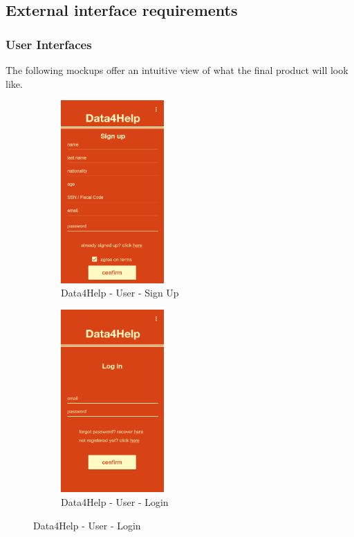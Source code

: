 \color{black}
{\color{secblue}\subsection{External interface requirements}}
{\color{secblue}\subsubsection{User Interfaces}}

The following mockups offer an intuitive view of what the final product will look like.

\begin{figure}[H]
\centering
\begin{subfigure}{.33\textwidth}
  \centering
  \includegraphics[width=.9\linewidth, height = 7cm, keepaspectratio]{./Images/Mockups/Data4Help/D4HU/D4HU_SignUp.png}
  \caption{Data4Help - User - Sign Up}
\end{subfigure}%
\begin{subfigure}{.33\textwidth}
  \centering
  \includegraphics[width = .9\linewidth, height = 7cm, keepaspectratio]{./Images/Mockups/Data4Help/D4HU/D4HU_Login.png}
  \caption{Data4Help - User - Login}
\end{subfigure}

\end{figure}
